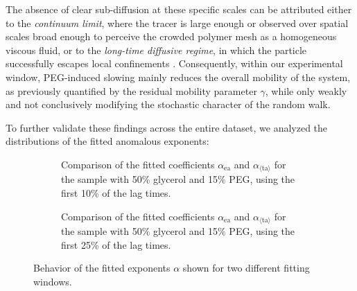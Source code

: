 The absence of clear sub-diffusion at these specific scales can be attributed either to the \textit{continuum limit}, where the tracer is large enough or observed over spatial scales broad enough to perceive the crowded polymer mesh as a homogeneous viscous fluid, or to the \textit{long-time diffusive regime}, in which the particle successfully escapes local confinements \cite{doi:10.1021/acs.langmuir.7b03418}. Consequently, within our experimental window, PEG-induced slowing mainly reduces the overall mobility of the system, as previously quantified by the residual mobility parameter $\gamma$, while only weakly and not conclusively modifying the stochastic character of the random walk.

To further validate these findings across the entire dataset, we analyzed the distributions of the fitted anomalous exponents:


\begin{figure}[!htbp]
    \centering
    \begin{subfigure}[t]{0.48\textwidth}
        \centering
        
        \caption{Comparison of the fitted coefficients $\alpha_{\mathrm{ea}}$ and $\alpha_{\langle \mathrm{ta} \rangle}$ for the sample with 50\% glycerol and 15\% PEG, using the first 10\% of the lag times.}
        \label{fig:alpha_paired_glic50_f010}
    \end{subfigure}
    \hfill
    \begin{subfigure}[t]{0.48\textwidth}
        \centering
        
        \caption{Comparison of the fitted coefficients $\alpha_{\mathrm{ea}}$ and $\alpha_{\langle \mathrm{ta} \rangle}$ for the sample with 50\% glycerol and 15\% PEG, using the first 25\% of the lag times.}
        \label{fig:alpha_paired_glic50_f025}
    \end{subfigure}

    \caption{Behavior of the fitted exponents $\alpha$ shown for two different fitting windows.}
    \label{fig:alpha_paired_glic50}
\end{figure}
\FloatBarrier

